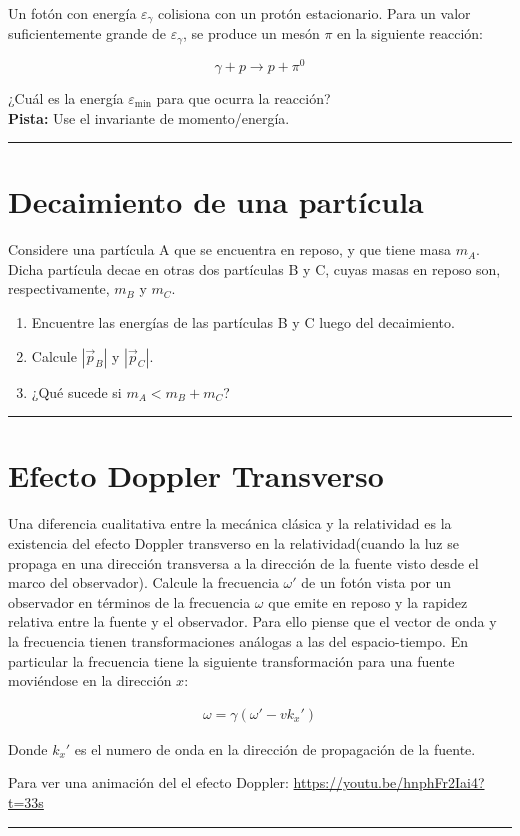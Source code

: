 \documentclass[12pt]{article}
\begin{document}
Un fotón con energía $\varepsilon_{\gamma}$ colisiona con un protón estacionario. Para un valor suficientemente grande de  $\varepsilon_{\gamma}$, se produce un mesón $\pi$ en la siguiente reacción:

$$ \gamma + p \rightarrow p + \pi^0 $$   

¿Cuál es la energía $\varepsilon_{\text{min}}$ para que ocurra la reacción?\\

\textbf{Pista:} Use el invariante de momento/energía.\\
\noindent\rule{16.5cm}{0.4pt}

\section{Decaimiento de una partícula}


Considere una partícula A que se encuentra en reposo, y que tiene masa $m_A$. Dicha
partícula decae en otras dos partículas B y C, cuyas masas en reposo son, respectivamente,
$m_B$ y $m_C$. 



\begin{enumerate}
	\item Encuentre las energías de las partículas B y C luego del decaimiento.
	\item Calcule $|\vec{p}_B|$ y $|\vec{p}_C|$.
	\item ¿Qué sucede si $m_A < m_B + m_C$?
\end{enumerate}


\noindent\rule{16.5cm}{0.4pt}



\section{Efecto Doppler Transverso}

Una diferencia cualitativa entre la mecánica clásica y la relatividad es la existencia del efecto Doppler transverso en la relatividad(cuando la luz se propaga en una dirección transversa a la dirección de la fuente visto desde el marco del observador).  Calcule la frecuencia $\omega'$ de un fotón vista por un observador en términos de la frecuencia $\omega$ que emite en reposo y la rapidez relativa entre la fuente y el observador. Para ello piense que el vector de onda y la frecuencia tienen transformaciones análogas a las del espacio-tiempo. En particular la frecuencia tiene la siguiente transformación para una fuente moviéndose en la dirección $x$:

\begin{align*}
\omega= \gamma\left(\omega' - v k_x'\right)
\end{align*} 

Donde $k_x'$ es el numero de onda en la dirección de propagación de la fuente.

Para ver una animación del el efecto Doppler: \url{https://youtu.be/hnphFr2Iai4?t=33s} 



\noindent\rule{16.5cm}{0.4pt}
\end{document}
